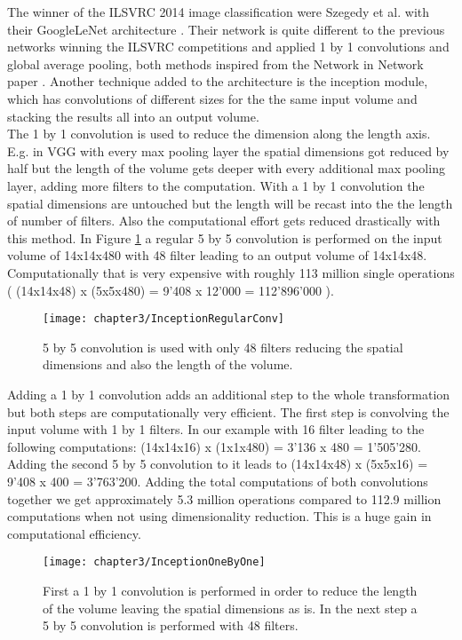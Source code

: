 The winner of the ILSVRC 2014 image classification were Szegedy et al. with their GoogleLeNet architecture \cite{szegedy2015going}. Their network is quite different to the previous networks winning the ILSVRC competitions and applied 1 by 1 convolutions and global average pooling, both methods inspired from the Network in Network paper \cite{lin2013network}. Another technique added to the architecture is the inception module, which has convolutions of different sizes for the the same input volume and stacking the results all into an output volume. \\

The 1 by 1 convolution is used to reduce the dimension along the length axis. E.g. in VGG with every max pooling layer the spatial dimensions got reduced by half but the length of the volume gets deeper with every additional max pooling layer, adding more filters to the computation. With a 1 by 1 convolution the spatial dimensions are untouched but the length will be recast into the the length of number of filters. Also the computational effort gets reduced drastically with this method. In Figure \ref{fig:InceptionRegularConv} a regular 5 by 5 convolution is performed on the input volume of 14x14x480 with 48 filter leading to an output volume of 14x14x48. Computationally that is very expensive with roughly 113 million single operations ( (14x14x48) x (5x5x480) = 9'408 x 12'000 = 112'896'000 ).

\begin{figure}[H]
  \centering
  \caption{5 by 5 convolution is used with only 48 filters reducing the spatial dimensions and also the length of the volume. \cite{ReviewGoogleLeNetv1}}
  \texttt{[image: chapter3/InceptionRegularConv]}
  \label{fig:InceptionRegularConv}
\end{figure}

Adding a 1 by 1 convolution adds an additional step to the whole transformation but both steps are computationally very efficient. The first step is convolving the input volume with 1 by 1 filters. In our example with 16 filter leading to the following computations: (14x14x16) x (1x1x480) = 3'136 x 480 = 1'505'280. Adding the second 5 by 5 convolution to it leads to (14x14x48) x (5x5x16) = 9'408 x 400 = 3'763'200. Adding the total computations of both convolutions together we get approximately 5.3 million operations compared to 112.9 million computations when not using dimensionality reduction. This is a huge gain in computational efficiency.

\begin{figure}[H]
  \centering
  \caption{First a 1 by 1 convolution is performed in order to reduce the length of the volume leaving the spatial dimensions as is. In the next step a 5 by 5 convolution is performed with 48 filters. \cite{ReviewGoogleLeNetv1}}
  \texttt{[image: chapter3/InceptionOneByOne]}
  \label{fig:parameters}
\end{figure}


